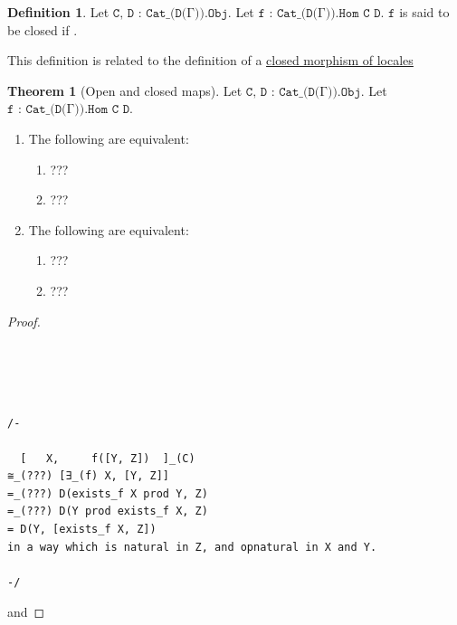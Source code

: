 \documentclass{book}
\theoremstyle{definition}
\newtheorem{definition}{Definition}
\newtheorem{theorem}{Theorem}
\newcounter{lcounter}
\begin{document}
\begin{definition}
Let $\texttt{C, D : Cat\_(D(Γ)).Obj}$. Let $\texttt{f : Cat\_(D(Γ)).Hom C D}$. $\texttt{f}$ is said to be closed if .
\end{definition}

This definition is related to the definition of a \href{https://ncatlab.org/nlab/show/closed+morphism}{closed morphism of locales}

\begin{theorem}[Open and closed maps]
Let $\texttt{C, D : Cat\_(D(Γ)).Obj}$. Let $\texttt{f : Cat\_(D(Γ)).Hom C D}$.
\begin{enumerate}
\item The following are equivalent: 
\begin{enumerate}
\item ??? 
\item ???
\end{enumerate}
\item The following are equivalent:
\begin{enumerate}
\item ??? 
\item ???
\end{enumerate}
\end{enumerate}
\end{theorem}

\begin{proof}


\begin{center}
\begin{tcolorbox}[width=5in,colback={white},title={\begin{center}\texttt{Lean \thelcounter} \addtocounter{lcounter}{1}  \end{center}},colbacktitle=Blue,coltitle=black]
\begin{verbatim}




/-

  [   X,     f([Y, Z])  ]_(C)
≅_(???) [∃_(f) X, [Y, Z]]
=_(???) D(exists_f X prod Y, Z)
=_(???) D(Y prod exists_f X, Z)
= D(Y, [exists_f X, Z])
in a way which is natural in Z, and opnatural in X and Y.

-/

\end{verbatim}
\end{tcolorbox}
\end{center}

and

\end{proof}
\end{document}
